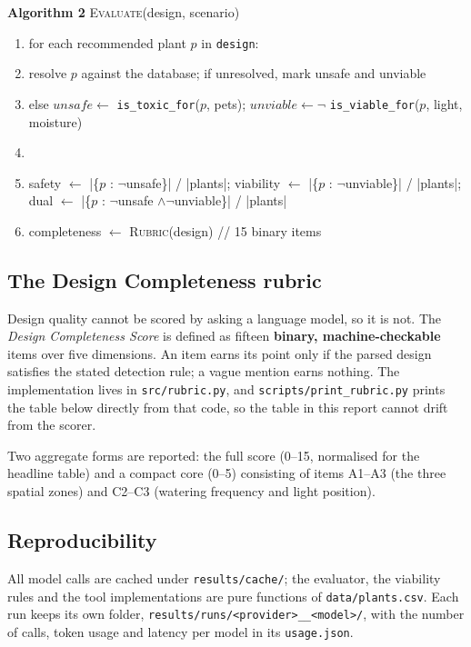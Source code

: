 \documentclass[12pt,a4paper]{article}
\begin{document}
\begin{table}[t]
\begin{minipage}{0.94\linewidth}
\textbf{Algorithm 2} \quad \textsc{Evaluate}(design, scenario)
\begin{enumerate}[leftmargin=1.6em]
  \item for each recommended plant $p$ in \texttt{design}:
  \item \quad resolve $p$ against the database; if unresolved, mark unsafe and unviable
  \item \quad else $unsafe \leftarrow$ \texttt{is\_toxic\_for}($p$, pets); \quad $unviable \leftarrow \neg$ \texttt{is\_viable\_for}($p$, light, moisture)
  \item \item safety $\leftarrow$ |\{$p$ : $\neg$unsafe\}| / |plants|; \quad
        viability $\leftarrow$ |\{$p$ : $\neg$unviable\}| / |plants|; \quad
        dual $\leftarrow$ |\{$p$ : $\neg$unsafe $\wedge \neg$unviable\}| / |plants|
  \item completeness $\leftarrow$ \textsc{Rubric}(design) \quad // 15 binary items
\end{enumerate}
\end{minipage}
\end{table}

\subsection{The Design Completeness rubric}
\label{sec:rubric}

Design quality cannot be scored by asking a language model, so it is not.
The \emph{Design Completeness Score} is defined as fifteen \textbf{binary,
machine-checkable} items over five dimensions. An item earns its point only
if the parsed design satisfies the stated detection rule; a vague mention
earns nothing. The implementation lives in \texttt{src/rubric.py}, and
\texttt{scripts/print\_rubric.py} prints the table below directly from that
code, so the table in this report cannot drift from the scorer.



Two aggregate forms are reported: the full score (0--15, normalised for the
headline table) and a compact core (0--5) consisting of items A1--A3 (the
three spatial zones) and C2--C3 (watering frequency and light position).

\subsection{Reproducibility}

All model calls are cached under \texttt{results/cache/}; the evaluator, the
viability rules and the tool implementations are pure functions of
\texttt{data/plants.csv}. Each run keeps its own folder,
\texttt{results/runs/<provider>\_\_<model>/}, with the number of calls, token
usage and latency per model in its \texttt{usage.json}.
\end{document}
